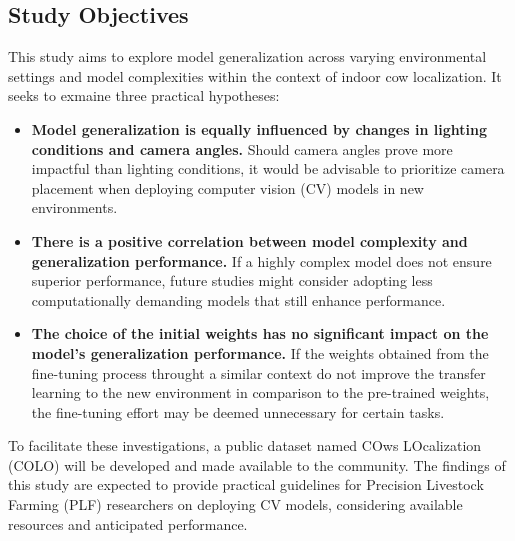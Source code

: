 \subsection*{Study Objectives}

This study aims to explore model generalization across varying environmental settings and model complexities within the context of indoor cow localization. It seeks to exmaine three practical hypotheses:

\begin{itemize}
    \item \textbf{Model generalization is equally influenced by changes in lighting conditions and camera angles.} Should camera angles prove more impactful than lighting conditions, it would be advisable to prioritize camera placement when deploying computer vision (CV) models in new environments.
    \item \textbf{There is a positive correlation between model complexity and generalization performance.} If a highly complex model does not ensure superior performance, future studies might consider adopting less computationally demanding models that still enhance performance.
    \item \textbf{The choice of the initial weights has no significant impact on the model's generalization performance.} If the weights obtained from the fine-tuning process throught a similar context do not improve the transfer learning to the new environment in comparison to the pre-trained weights, the fine-tuning effort may be deemed unnecessary for certain tasks.
\end{itemize}

To facilitate these investigations, a public dataset named COws LOcalization (COLO) will be developed and made available to the community. The findings of this study are expected to provide practical guidelines for Precision Livestock Farming (PLF) researchers on deploying CV models, considering available resources and anticipated performance.
